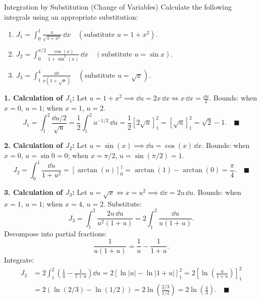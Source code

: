 \begin{exercise}{Integration by Substitution (Change of Variables)}
Calculate the following integrals using an appropriate substitution:
\begin{enumerate}[leftmargin=1.5em,itemsep=2pt]
  \item $J_1 = \int_0^1 \frac{x}{\sqrt{1 + x^2}}\,\dd x \quad (\text{substitute } u = 1 + x^2)$.
  \item $J_2 = \int_0^{\pi/2} \frac{\cos(x)}{1 + \sin^2(x)}\,\dd x \quad (\text{substitute } u = \sin x)$.
  \item $J_3 = \int_1^4 \frac{\dd x}{x(1 + \sqrt{x})} \quad (\text{substitute } u = \sqrt{x})$.
\end{enumerate}
\end{exercise}

\begin{tabletworkspace}[5.0cm]
\end{tabletworkspace}

\begin{solution}
\textbf{1. Calculation of $J_1$:}
Let $u = 1 + x^2 \implies \dd u = 2x\,\dd x \iff x\,\dd x = \frac{\dd u}{2}$.
Bounds: when $x = 0$, $u = 1$; when $x = 1$, $u = 2$.
\[
J_1 = \int_1^2 \frac{\dd u / 2}{\sqrt{u}} = \frac{1}{2} \int_1^2 u^{-1/2}\,\dd u = \frac{1}{2} \left[ 2\sqrt{u} \right]_1^2 = [\sqrt{u}]_1^2 = \sqrt{2} - 1. \quad \blacksquare
\]

\textbf{2. Calculation of $J_2$:}
Let $u = \sin(x) \implies \dd u = \cos(x)\,\dd x$.
Bounds: when $x = 0$, $u = \sin 0 = 0$; when $x = \pi/2$, $u = \sin(\pi/2) = 1$.
\[
J_2 = \int_0^1 \frac{\dd u}{1 + u^2} = [\arctan(u)]_0^1 = \arctan(1) - \arctan(0) = \frac{\pi}{4}. \quad \blacksquare
\]

\textbf{3. Calculation of $J_3$:}
Let $u = \sqrt{x} \iff x = u^2 \implies \dd x = 2u\,\dd u$.
Bounds: when $x = 1$, $u = 1$; when $x = 4$, $u = 2$.
Substitute:
\[
J_3 = \int_1^2 \frac{2u\,\dd u}{u^2(1 + u)} = 2 \int_1^2 \frac{\dd u}{u(1 + u)}.
\]
Decompose into partial fractions:
\[
\frac{1}{u(1 + u)} = \frac{1}{u} - \frac{1}{1 + u}.
\]
Integrate:
\begin{align*}
J_3 &= 2 \int_1^2 \left( \frac{1}{u} - \frac{1}{1 + u} \right)\dd u = 2 [\ln|u| - \ln|1 + u|]_1^2 = 2 \left[ \ln\left(\frac{u}{1 + u}\right) \right]_1^2 \\
&= 2 \left( \ln(2/3) - \ln(1/2) \right) = 2 \ln\left(\frac{2/3}{1/2}\right) = 2 \ln\left(\frac{4}{3}\right). \quad \blacksquare
\end{align*}
\end{solution}

